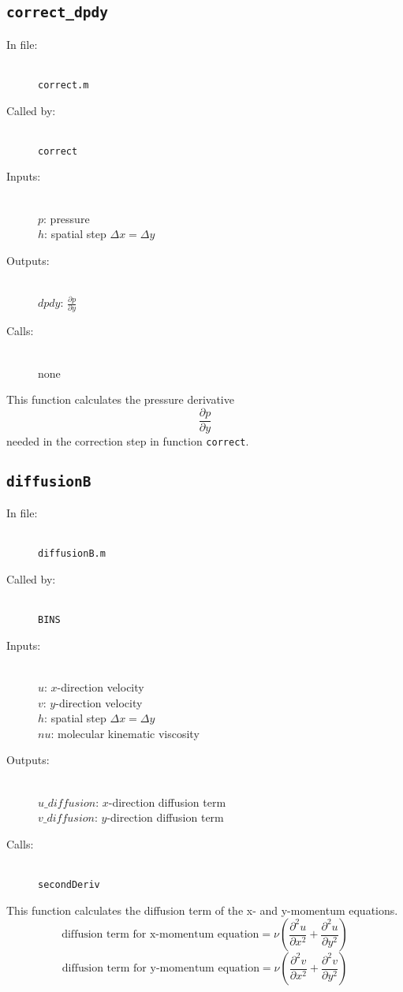 \documentclass[12pt]{article}
\begin{document}
\subsection{\texttt{correct\_dpdy}}
\begin{description}
\item[In file:] \hfill \\ \texttt{correct.m}
\item[Called by:] \hfill \\ \texttt{correct}
\item[Inputs:] \hfill \\ $p$: pressure \\ $h$: spatial step $\Delta x = \Delta y$
\item[Outputs:] \hfill \\ $dpdy$: $\frac{\partial p}{\partial y}$
\item[Calls:] \hfill \\ none
\end{description}
This function calculates the pressure derivative
\[ \frac{\partial p}{\partial y}\]
needed in the correction step in function \texttt{correct}.

\subsection{\texttt{diffusionB}}
\begin{description}
\item[In file:] \hfill \\ \texttt{diffusionB.m}
\item[Called by:] \hfill \\ \texttt{BINS}
\item[Inputs:] \hfill \\ $u$: $x$-direction velocity \\ $v$: $y$-direction velocity \\ $h$: spatial step $\Delta x = \Delta y$ \\ $nu$: molecular kinematic viscosity
\item[Outputs:] \hfill \\ $u\_diffusion$: $x$-direction diffusion term \\ $v\_diffusion$: $y$-direction diffusion term 
\item[Calls:] \hfill \\ \texttt{secondDeriv}
\end{description}
This function calculates the diffusion term of the x- and y-momentum equations.
\[ \text{diffusion term for x-momentum equation} = \nu \left(\frac{\partial^2 u}{\partial x^2} + \frac{\partial^2 u}{\partial y^2}\right) \]
\[ \text{diffusion term for y-momentum equation} = \nu \left(\frac{\partial^2 v}{\partial x^2} + \frac{\partial^2 v}{\partial y^2}\right) \]
\end{document}
